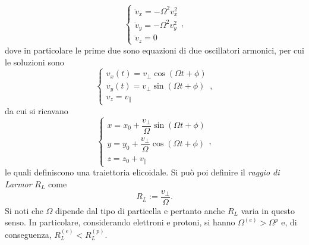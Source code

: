 \begin{equation}
    \begin{cases}
        \ddot{v}_x = -\Omega^2 v_x^2 \\
        \ddot{v}_y = -\Omega^2 v_y^2 \\
        \ddot{v}_z = 0
    \end{cases},
\end{equation}
dove in particolare le prime due sono equazioni di due oscillatori armonici, per cui le soluzioni sono
\begin{equation}
    \begin{cases}
        v_x(t) = v_\perp \cos{(\Omega t + \phi)} \\
        v_y(t) = v_\perp \sin{(\Omega t + \phi)} \\
        v_z = v_\parallel
    \end{cases},
\end{equation}
da cui si ricavano
\begin{equation}
    \begin{cases}
        x = x_0 + \dfrac{v_\perp}{\Omega}\sin{(\Omega t + \phi)} \\[2ex]
        y = y_0 + \dfrac{v_\perp}{\Omega}\cos{(\Omega t + \phi)} \\[2ex]
        z = z_0 + v_\parallel
    \end{cases},
\end{equation}
le quali definiscono una traiettoria elicoidale. Si può poi definire il \emph{raggio di Larmor} $R_L$ come 
\begin{equation}
    R_L := \frac{v_\perp}{\Omega}.
\end{equation}
Si noti che $\Omega$ dipende dal tipo di particella e pertanto anche $R_L$ varia in questo senso. In particolare, considerando elettroni e protoni, si hanno $\Omega^{(e)} > \Omega^{p}$ e, di conseguenza, $R_L^{(e)} < R_L^{(p)}$. 

